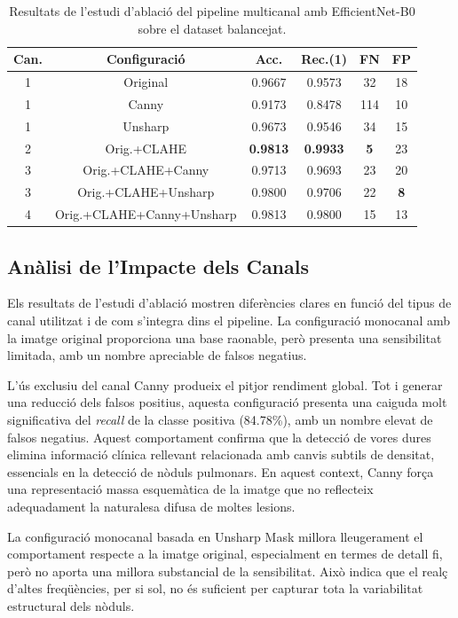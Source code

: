 \documentclass[12pt,a4paper]{article}
\begin{document}
\begin{table}[H]
\centering
\scriptsize
\renewcommand{\arraystretch}{1.1}
\begin{tabular}{c c c c c c}
\toprule
\textbf{Can.} & \textbf{Configuració} & \textbf{Acc.} & \textbf{Rec.(1)} & \textbf{FN} & \textbf{FP} \\
\midrule
1 & Original & 0.9667 & 0.9573 & 32 & 18 \\
1 & Canny & 0.9173 & 0.8478 & 114 & 10 \\
1 & Unsharp & 0.9673 & 0.9546 & 34 & 15 \\
2 & Orig.+CLAHE & \textbf{0.9813} & \textbf{0.9933} & \textbf{5} & 23 \\
3 & Orig.+CLAHE+Canny & 0.9713 & 0.9693 & 23 & 20 \\
3 & Orig.+CLAHE+Unsharp & 0.9800 & 0.9706 & 22 & \textbf{8} \\
4 & Orig.+CLAHE+Canny+Unsharp & 0.9813 & 0.9800 & 15 & 13 \\
\bottomrule
\end{tabular}
\caption{Resultats de l’estudi d’ablació del pipeline multicanal amb EfficientNet-B0 sobre el dataset balancejat.}
\label{tab:ablation_results}
\end{table}


\subsection{Anàlisi de l’Impacte dels Canals}

Els resultats de l’estudi d’ablació mostren diferències clares en funció del tipus de
canal utilitzat i de com s’integra dins el pipeline. La configuració monocanal amb la
imatge original proporciona una base raonable, però presenta una sensibilitat limitada,
amb un nombre apreciable de falsos negatius.

L’ús exclusiu del canal Canny produeix el pitjor rendiment global. Tot i generar una
reducció dels falsos positius, aquesta configuració presenta una caiguda molt significativa
del \textit{recall} de la classe positiva (84.78\%), amb un nombre elevat de falsos
negatius. Aquest comportament confirma que la detecció de vores dures elimina informació
clínica rellevant relacionada amb canvis subtils de densitat, essencials en la detecció
de nòduls pulmonars. En aquest context, Canny força una representació massa esquemàtica
de la imatge que no reflecteix adequadament la naturalesa difusa de moltes lesions.

La configuració monocanal basada en Unsharp Mask millora lleugerament el comportament
respecte a la imatge original, especialment en termes de detall fi, però no aporta una
millora substancial de la sensibilitat. Això indica que el realç d’altes freqüències,
per si sol, no és suficient per capturar tota la variabilitat estructural dels nòduls.
\end{document}
